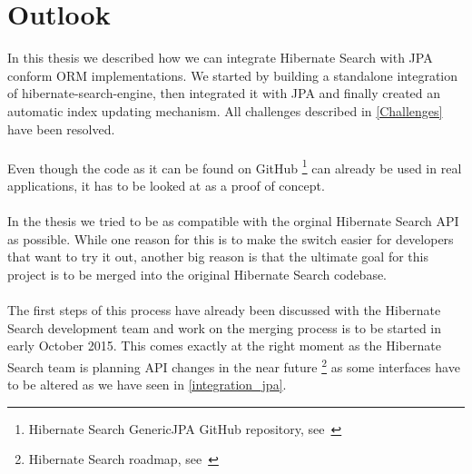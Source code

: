 \section{Outlook}\label{outlook}

In this thesis we described how we can integrate Hibernate Search with JPA conform ORM implementations. We started by building a standalone integration of hibernate-search-engine, then integrated it with JPA and finally created an automatic index updating mechanism. All challenges described in \ref{Challenges} have been resolved.
\\\\
Even though the code as it can be found on GitHub \footnote{Hibernate Search GenericJPA GitHub repository, see~\cite{hibernate_genericjpa_github}} can already be used in real applications, it has to be looked at as a proof of concept. 
\\\\
In the thesis we tried to be as compatible with the orginal Hibernate Search API as possible. While one reason for this is to make the switch easier for developers that want to try it out, another big reason is that the ultimate goal for this project is to be merged into the original Hibernate Search codebase.
\\\\
The first steps of this process have already been discussed with the Hibernate Search development team and work on the merging process is to be started in early October 2015. This comes exactly at the right moment as the Hibernate Search team is planning API changes in the near future \footnote{Hibernate Search roadmap, see~\cite{hibernate_search_roadmap}} as some interfaces have to be altered as we have seen in \ref{integration_jpa}.